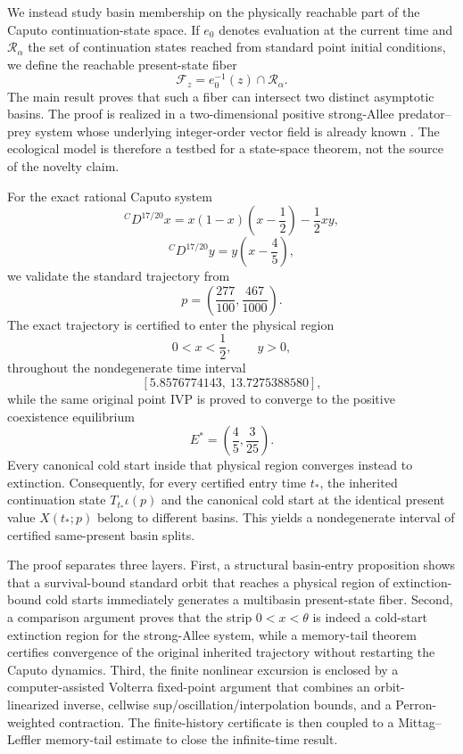 

We instead study basin membership on the physically reachable part of the Caputo continuation-state space.  If \(e_0\) denotes evaluation at the current time and \(\mathcal{R}_\alpha\) the set of continuation states reached from standard point initial conditions, we define the reachable present-state fiber
\[
  \mathcal{F}_z
  =
  e_0^{-1}(z)\cap\mathcal{R}_\alpha.
\]
The main result proves that such a fiber can intersect two distinct asymptotic basins.  The proof is realized in a two-dimensional positive strong-Allee predator--prey system whose underlying integer-order vector field is already known
\cite{YeEtAl2019StrongAlleePredatorPrey}.  The ecological model is therefore a testbed for a state-space theorem, not the source of the novelty claim.

For the exact rational Caputo system
\[
  {}^CD^{17/20}x
  =
  x(1-x)\left(x-\frac12\right)-\frac12xy,
\]
\[
  {}^CD^{17/20}y
  =
  y\left(x-\frac45\right),
\]
we validate the standard trajectory from
\[
  p=
  \left(
  \frac{277}{100},
  \frac{467}{1000}
  \right).
\]
The exact trajectory is certified to enter the physical region
\[
  0<x<\frac12,
  \qquad y>0,
\]
throughout the nondegenerate time interval
\[
  [5.8576774143,\ 13.7275388580],
\]
while the same original point IVP is proved to converge to the positive coexistence equilibrium
\[
  E^*=
  \left(
  \frac45,\frac3{25}
  \right).
\]
Every canonical cold start inside that physical region converges instead to extinction.  Consequently, for every certified entry time \(t_*\), the inherited continuation state \(T_{t_*}\iota(p)\) and the canonical cold start at the identical present value \(X(t_*;p)\) belong to different basins.  This yields a nondegenerate interval of certified same-present basin splits.

The proof separates three layers.  First, a structural basin-entry proposition shows that a survival-bound standard orbit that reaches a physical region of extinction-bound cold starts immediately generates a multibasin present-state fiber.  Second, a comparison argument proves that the strip \(0<x<\theta\) is indeed a cold-start extinction region for the strong-Allee system, while a memory-tail theorem certifies convergence of the original inherited trajectory without restarting the Caputo dynamics.  Third, the finite nonlinear excursion is enclosed by a computer-assisted Volterra fixed-point argument that combines an orbit-linearized inverse, cellwise sup/oscillation/interpolation bounds, and a Perron-weighted contraction.  The finite-history certificate is then coupled to a Mittag--Leffler memory-tail estimate to close the infinite-time result.

